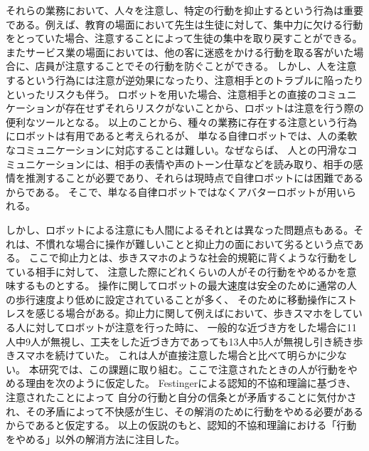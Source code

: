 \documentclass[11pt,a4j]{jreport}
\begin{document}
それらの業務において、人々を注意し、特定の行動を抑止するという行為は重要である。例えば、教育の場面において先生は生徒に対して、集中力に欠ける行動をとっていた場合、注意することによって生徒の集中を取り戻すことができる。
またサービス業の場面においては、他の客に迷惑をかける行動を取る客がいた場合に、店員が注意することでその行動を防ぐことができる。
しかし、人を注意するという行為には注意が逆効果になったり、注意相手とのトラブルに陥ったりといったリスクも伴う。
ロボットを用いた場合、注意相手との直接のコミュニケーションが存在せずそれらリスクがないことから、ロボットは注意を行う際の便利なツールとなる。
以上のことから、種々の業務に存在する注意という行為にロボットは有用であると考えられるが、
単なる自律ロボットでは、人の柔軟なコミュニケーションに対応することは難しい。なぜならば、
人との円滑なコミュニケーションには、相手の表情や声のトーン仕草などを読み取り、相手の感情を推測することが必要であり、それらは現時点で自律ロボットには困難であるからである。
そこで、単なる自律ロボットではなくアバターロボットが用いられる。

しかし、ロボットによる注意にも人間によるそれとは異なった問題点もある。それは、不慣れな場合に操作が難しいことと抑止力の面において劣るという点である。
ここで抑止力とは、歩きスマホのような社会的規範に背くような行動をしている相手に対して、
注意した際にどれくらいの人がその行動をやめるかを意味するものとする。
操作に関してロボットの最大速度は安全のために通常の人の歩行速度より低めに設定されていることが多く、
そのために移動操作にストレスを感じる場合がある。抑止力に関して例えば\cite{Mizumaru2019}において、歩きスマホをしている人に対してロボットが注意を行った時に、
一般的な近づき方をした場合に11人中9人が無視し、工夫をした近づき方であっても13人中5人が無視し引き続き歩きスマホを続けていた。
これは人が直接注意した場合と比べて明らかに少ない。
本研究では、この課題に取り組む。ここで注意されたときの人が行動をやめる理由を次のように仮定した。
Festingerによる認知的不協和理論\cite{Festinger1957}に基づき、
注意されたことによって
自分の行動と自分の信条とが矛盾することに気付かされ、その矛盾によって不快感が生じ、その解消のために行動をやめる必要があるからであると仮定する。
以上の仮説のもと、認知的不協和理論における「行動をやめる」以外の解消方法に注目した。
\end{document}
